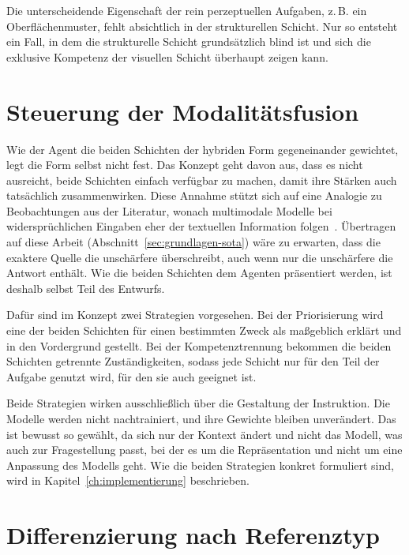 Die unterscheidende Eigenschaft der rein perzeptuellen Aufgaben, z.\,B. ein Oberflächenmuster, fehlt absichtlich in der strukturellen Schicht.
Nur so entsteht ein Fall, in dem die strukturelle Schicht grundsätzlich blind ist und sich die exklusive Kompetenz der visuellen Schicht überhaupt zeigen kann.


\section{Steuerung der Modalitätsfusion}
\label{sec:konz-fusion}

Wie der Agent die beiden Schichten der hybriden Form gegeneinander gewichtet, legt die Form selbst nicht fest.
Das Konzept geht davon aus, dass es nicht ausreicht, beide Schichten einfach verfügbar zu machen, damit ihre Stärken auch tatsächlich zusammenwirken.
Diese Annahme stützt sich auf eine Analogie zu Beobachtungen aus der Literatur, wonach multimodale Modelle bei widersprüchlichen Eingaben eher der textuellen Information folgen~\cite{deng2025, wu2025}.
Übertragen auf diese Arbeit (Abschnitt~\ref{sec:grundlagen-sota}) wäre zu erwarten, dass die exaktere Quelle die unschärfere überschreibt, auch wenn nur die unschärfere die Antwort enthält.
Wie die beiden Schichten dem Agenten präsentiert werden, ist deshalb selbst Teil des Entwurfs.

Dafür sind im Konzept zwei Strategien vorgesehen.
Bei der Priorisierung wird eine der beiden Schichten für einen bestimmten Zweck als maßgeblich erklärt und in den Vordergrund gestellt.
Bei der Kompetenztrennung bekommen die beiden Schichten getrennte Zuständigkeiten, sodass jede Schicht nur für den Teil der Aufgabe genutzt wird, für den sie auch geeignet ist.

Beide Strategien wirken ausschließlich über die Gestaltung der Instruktion.
Die Modelle werden nicht nachtrainiert, und ihre Gewichte bleiben unverändert.
Das ist bewusst so gewählt, da sich nur der Kontext ändert und nicht das Modell, was auch zur Fragestellung passt, bei der es um die Repräsentation und nicht um eine Anpassung des Modells geht.
Wie die beiden Strategien konkret formuliert sind, wird in Kapitel~\ref{ch:implementierung} beschrieben.


\section{Differenzierung nach Referenztyp}
\label{sec:konz-referenztyp}

